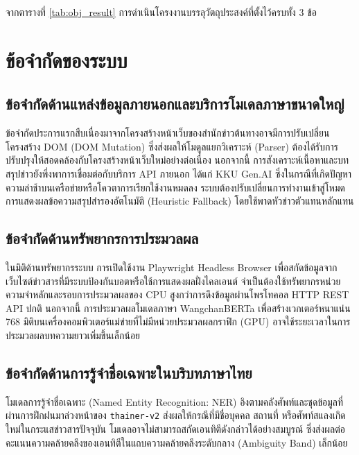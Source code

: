จากตารางที่ \ref{tab:obj_result} การดำเนินโครงงานบรรลุวัตถุประสงค์ที่ตั้งไว้ครบทั้ง 3 ข้อ

\section{ข้อจำกัดของระบบ}

\subsection{ข้อจำกัดด้านแหล่งข้อมูลภายนอกและบริการโมเดลภาษาขนาดใหญ่}

ข้อจำกัดประการแรกสืบเนื่องมาจากโครงสร้างหน้าเว็บของสำนักข่าวต้นทางอาจมีการปรับเปลี่ยนโครงสร้าง DOM (DOM Mutation) ซึ่งส่งผลให้โมดูลแยกวิเคราะห์ (Parser) ต้องได้รับการปรับปรุงให้สอดคล้องกับโครงสร้างหน้าเว็บใหม่อย่างต่อเนื่อง นอกจากนี้ การสังเคราะห์เนื้อหาและบทสรุปข่าวยังพึ่งพาการเชื่อมต่อกับบริการ API ภายนอก ได้แก่ KKU Gen.AI ซึ่งในกรณีที่เกิดปัญหาความล่าช้าบนเครือข่ายหรือโควตาการเรียกใช้งานหมดลง ระบบต้องปรับเปลี่ยนการทำงานเข้าสู่โหมดการแสดงผลข้อความสรุปสำรองอัตโนมัติ (Heuristic Fallback) โดยใช้พาดหัวข่าวตัวแทนหลักแทน

\subsection{ข้อจำกัดด้านทรัพยากรการประมวลผล}

ในมิติด้านทรัพยากรระบบ การเปิดใช้งาน Playwright Headless Browser เพื่อสกัดข้อมูลจากเว็บไซต์ข่าวสารที่มีระบบป้องกันบอตหรือใช้การแสดงผลฝั่งไคลเอนต์ จำเป็นต้องใช้ทรัพยากรหน่วยความจำหลักและรอบการประมวลผลของ CPU สูงกว่าการดึงข้อมูลผ่านโพรโทคอล HTTP REST API ปกติ นอกจากนี้ การประมวลผลโมเดลภาษา WangchanBERTa เพื่อสร้างเวกเตอร์หนาแน่น 768 มิติบนเครื่องคอมพิวเตอร์แม่ข่ายที่ไม่มีหน่วยประมวลผลกราฟิก (GPU) อาจใช้ระยะเวลาในการประมวลผลบทความยาวเพิ่มขึ้นเล็กน้อย

\subsection{ข้อจำกัดด้านการรู้จำชื่อเฉพาะในบริบทภาษาไทย}

โมเดลการรู้จำชื่อเฉพาะ (Named Entity Recognition: NER) อิงตามคลังศัพท์และชุดข้อมูลที่ผ่านการฝึกฝนมาล่วงหน้าของ \texttt{thainer-v2} ส่งผลให้กรณีที่มีชื่อบุคคล สถานที่ หรือศัพท์สแลงเกิดใหม่ในกระแสข่าวสารปัจจุบัน โมเดลอาจไม่สามารถสกัดเอนทิตีดังกล่าวได้อย่างสมบูรณ์ ซึ่งส่งผลต่อคะแนนความคล้ายคลึงของเอนทิตีในแถบความคล้ายคลึงระดับกลาง (Ambiguity Band) เล็กน้อย

